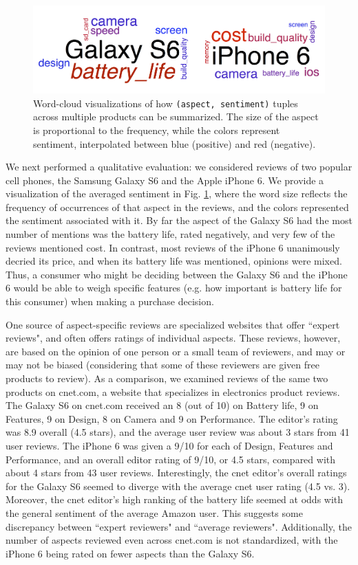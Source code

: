 \documentclass{article} %
\begin{document}
\begin{figure}[ht]
\begin{center}
\includegraphics[width=\columnwidth]{productCloud.png}
\end{center}
\caption{Word-cloud visualizations of how \texttt{(aspect, sentiment)} tuples across multiple products can be summarized. The size of the aspect is proportional to the frequency, while the colors represent sentiment, interpolated between blue (positive) and red (negative). }
\label{productFig}
\end{figure}

We next performed a qualitative evaluation: we considered reviews of two popular cell phones, the Samsung Galaxy S6 and the Apple iPhone 6. We provide a visualization of the averaged sentiment in Fig. \ref{productFig}, where the word size reflects the frequency of occurrences of that aspect in the reviews, and the colors represented the sentiment associated with it. By far the aspect of the Galaxy S6 had the most number of mentions was the battery life, rated negatively, and very few of the reviews mentioned cost. In contrast, most reviews of the iPhone 6 unanimously decried its price, and when its battery life was mentioned, opinions were mixed. Thus, a consumer who might be deciding between the Galaxy S6 and the iPhone 6 would be able to weigh specific features (e.g. how important is battery life for this consumer) when making a purchase decision.

One source of aspect-specific reviews are specialized websites that offer ``expert reviews", and often offers ratings of individual aspects. These reviews, however, are based on the opinion of one person or a small team of reviewers, and may or may not be biased (considering that some of these reviewers are given free products to review). As a comparison, we examined reviews of the same two products on cnet.com, a website that specializes in electronics product reviews. The Galaxy S6 on cnet.com received an 8 (out of 10) on Battery life, 9 on Features, 9 on Design, 8 on Camera and 9 on Performance. The editor's rating was 8.9 overall (4.5 stars), and the average user review was about 3 stars from 41 user reviews. The iPhone 6 was given a 9/10 for each of Design, Features and Performance, and an overall editor rating of 9/10, or 4.5 stars, compared with about 4 stars from 43 user reviews. Interestingly, the cnet editor's overall ratings for the Galaxy S6 seemed to diverge with the average cnet user rating (4.5 vs. 3). Moreover, the cnet editor's high ranking of the battery life seemed at odds with the general sentiment of the average Amazon user. This suggests some discrepancy between ``expert reviewers" and ``average reviewers". Additionally, the number of aspects reviewed even across cnet.com is not standardized, with the iPhone 6 being rated on fewer aspects than the Galaxy S6.
\end{document}

